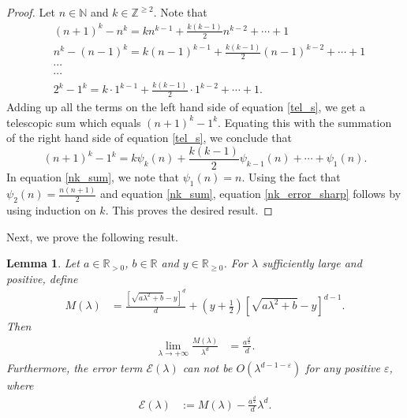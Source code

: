 \documentclass[11pt,lettersize,reqno,fullpage]{amsart}
\newtheorem{lmm}[thm]{Lemma}
\begin{document}
\begin{proof}
Let $n \in \mathbb{N} $ and $k\in \mathbb{Z}^{\geq 2} $. 
Note that
\begin{equation}
\label{tel_s}
\begin{aligned}
&(n+1)^{k}-n^{k}= kn^{k-1}+\frac{k(k-1)}{2} n^{k-2}+ \cdots + 1\\
&n^{k}-(n-1)^{k}= k(n-1)^{k-1}+\frac{k(k-1)}{2} (n-1)^{k-2}+ \cdots + 1\\
&\cdots \\
&\cdots \\
&2^{k}-1^{k}= k \cdot 1^{k-1}+ \frac{k(k-1)}{2} \cdot 1^{k-2} + \cdots+ 1.
\end{aligned}
\end{equation}
Adding up all the terms on 
the left hand side of 
equation 
\eqref{tel_s}, we get a telescopic sum which equals 
$(n+1)^{k}-1^{k}$. 
Equating this with the summation of the right hand 
side of equation \eqref{tel_s}, 
we conclude that     
\begin{equation}
(n+1)^{k}-1^{k} = k\psi_{k}(n)+\frac{k(k-1)}{2} \psi_{k-1}(n)+\cdots+\psi_1(n). 
\label{nk_sum}
\end{equation}
In equation \eqref{nk_sum}, we note that $\psi_{1}(n)=n $.
Using the fact that $\psi_2(n) = \frac{n(n+1)}{2}$ 
and equation \eqref{nk_sum}, equation \eqref{nk_error_sharp} 
follows by using induction on $k$. 
This proves the desired result.  
\end{proof}
Next, we prove the following result. 
\begin{lmm}
\label{sharp_main}
Let $a \in \mathbb{R}_{>0}$, $b\in \mathbb{R}$ and $y \in \mathbb{R}_{\geq 0}$. For $\lambda$ 
sufficiently large and positive, define 
\begin{align*}
M(\lambda)& = \frac{[\sqrt{a\lambda^2+b}-y]^d}{d} + (y+\frac{1}{2})[\sqrt{a\lambda^2+b}-y]^{d-1}.
\end{align*}
Then
\begin{align}
\lim_{\lambda\longrightarrow +\infty} \frac{M(\lambda)}{\lambda^d} & = \frac{a^{\frac{d}{2}}}{d}. 
\label{M_leading}
\end{align}
Furthermore, the error term $\mathcal{E}(\lambda)$ can not be $O(\lambda^{d-1-\varepsilon})$ 
for any positive $\varepsilon$, where 
\begin{align*}
\mathcal{E}(\lambda) &:= M(\lambda)-\frac{a^{\frac{d}{2}}}{d} \lambda^d.
\end{align*}
\end{lmm} 
\end{document}
